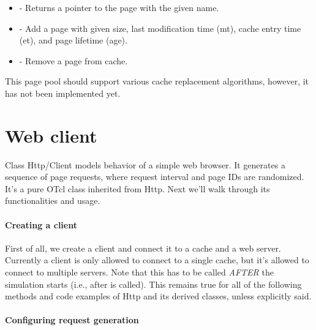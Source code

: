 \begin{itemize}
\item {} - Returns a pointer to the
  page with the given name. 
\item {} - Add a page with given size, last modification
    time (mt), cache entry time (et), and page lifetime (age). 
\item {} - Remove a page from cache.
\end{itemize}

This page pool should support various cache replacement algorithms,
however, it has not been implemented yet. 


\section{Web client}
\label{sec:webcache-client}

Class Http/Client models behavior of a simple web browser. It
generates a sequence of page requests, where request interval and page 
IDs are randomized. It's a pure OTcl class inherited from Http. 
Next we'll walk through its functionalities and usage.

\paragraph{Creating a client}

First of all, we create a client and connect it to a cache and a web server.
Currently a client is only allowed to connect to a single cache, but it's 
allowed to connect to multiple servers. Note that this has to be called 
\emph{AFTER} the simulation starts (i.e., after  %
is called).
This remains true for all of the following methods and code examples of 
Http and its derived classes, unless explicitly said.


\paragraph{Configuring request generation}

